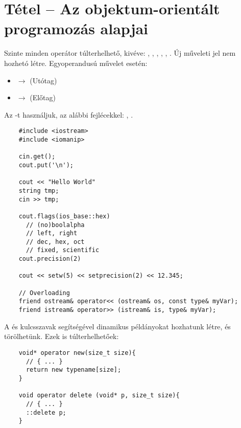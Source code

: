 \documentclass[main.tex]{subfiles}
\begin{document}
  \pagebreak
  \section{Tétel – Az objektum-orientált programozás alapjai} %

  Szinte minden operátor túlterhelhető, kivéve:
  \kkod{::}, , , ,
  , .
  Új műveleti jel nem hozhetó létre.
  Egyoperandusú művelet esetén:
  \begin{itemize}
    \item {}
    \hspace{11.5mm} $\rightarrow$ \hspace{5mm}
     \hspace{5mm} (Utótag)

    \item {}
    \hspace{5mm} $\rightarrow$ \hspace{5mm}
     \hspace{5mm} (Előtag)
  \end{itemize}


  Az -t használjuk, az alábbi fejlécekkel:
  , .
  \begin{lstlisting}
    #include <iostream>
    #include <iomanip>

    cin.get();
    cout.put('\n');

    cout << "Hello World"
    string tmp;
    cin >> tmp;

    cout.flags(ios_base::hex)
      // (no)boolalpha
      // left, right
      // dec, hex, oct
      // fixed, scientific
    cout.precision(2)

    cout << setw(5) << setprecision(2) << 12.345;

    // Overloading
    friend ostream& operator<< (ostream& os, const type& myVar);
    friend istream& operator>> (istream& is, type& myVar);
  \end{lstlisting}


  A  és  kulcsszavak segítségével
  dinamikus példányokat hozhatunk létre, és törölhetünk.
  Ezek is túlterhelhetőek:
  \begin{lstlisting}
    void* operator new(size_t size){
      // { ... }
      return new typename[size];
    }

    void operator delete (void* p, size_t size){
      // { ... }
      ::delete p;
    }
  \end{lstlisting}
\end{document}
